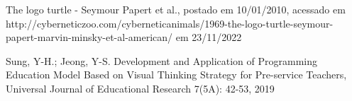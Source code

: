 \documentclass[
12pt,		%
openright,	%
twoside,  %
a4paper,			%
chapter=TITLE,		%
english,			%
french,				%
spanish,			%
brazil				%
]{USPSC-classe/USPSC}
\begin{document}
\begin{flushleft}
\begin{flushleft}
\begin{flushleft}
\begin{flushleft}
\begin{flushleft}
\begin{flushleft}
\begin{flushleft}
\begin{flushleft}
[CIBERNECTZOO, 2010] The logo turtle - Seymour Papert et al., postado em 10/01/2010, acessado em http://cyberneticzoo.com/cyberneticanimals/1969-the-logo-turtle-seymour-papert-marvin-minsky-et-al-american/ em 23/11/2022
\end{flushleft}


\end{flushleft}


\end{flushleft}


\end{flushleft}


\end{flushleft}


\end{flushleft}


\end{flushleft}


\end{flushleft}


\begin{flushleft}
\begin{flushleft}
\begin{flushleft}
\begin{flushleft}
\begin{flushleft}
\begin{flushleft}
\begin{flushleft}
\begin{flushleft}
[SUNG, 2019] Sung, Y-H.; Jeong, Y-S. Development and Application of Programming Education Model Based on Visual Thinking Strategy for Pre-service Teachers, Universal Journal of Educational Research 7(5A): 42-53, 2019
\end{flushleft}


\end{flushleft}


\end{flushleft}


\end{flushleft}


\end{flushleft}


\end{flushleft}


\end{flushleft}


\end{flushleft}
\end{document}
